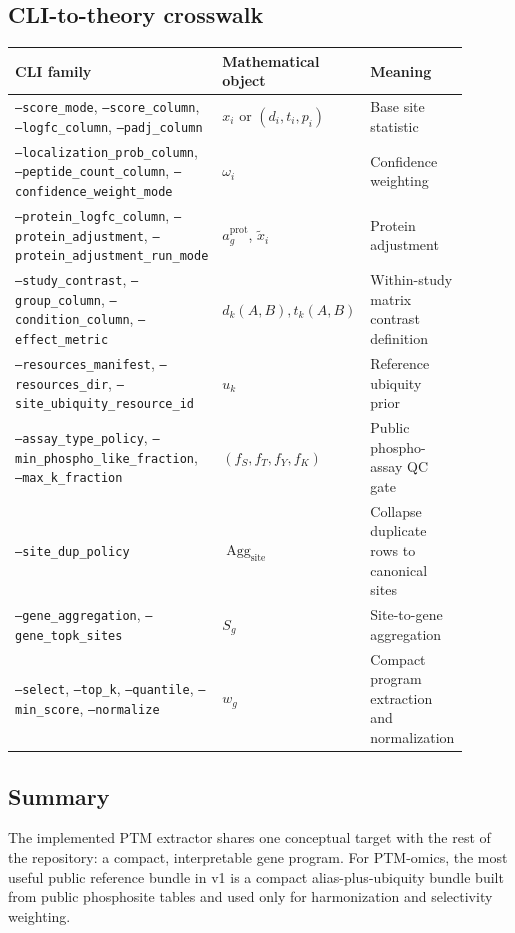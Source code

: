 \documentclass[11pt]{article}
\begin{document}
\subsection{CLI-to-theory crosswalk}
\begin{center}
\begin{tabular}{p{0.30\linewidth} p{0.28\linewidth} p{0.32\linewidth}}
\hline
CLI family & Mathematical object & Meaning \\
\hline
\texttt{--score\_mode}, \texttt{--score\_column}, \texttt{--logfc\_column},
\texttt{--padj\_column} & $x_i$ or $(d_i,t_i,p_i)$ &
Base site statistic \\
\texttt{--localization\_prob\_column}, \texttt{--peptide\_count\_column},
\texttt{--confidence\_weight\_mode} & $\omega_i$ &
Confidence weighting \\
\texttt{--protein\_logfc\_column}, \texttt{--protein\_adjustment},
\texttt{--protein\_adjustment\_run\_mode} &
$a_g^{\mathrm{prot}}$, $\widetilde{x}_i$ &
Protein adjustment \\
\texttt{--study\_contrast}, \texttt{--group\_column},
\texttt{--condition\_column}, \texttt{--effect\_metric} &
$d_k(A,B), t_k(A,B)$ &
Within-study matrix contrast definition \\
\texttt{--resources\_manifest}, \texttt{--resources\_dir},
\texttt{--site\_ubiquity\_resource\_id} & $u_k$ &
Reference ubiquity prior \\
\texttt{--assay\_type\_policy}, \texttt{--min\_phospho\_like\_fraction},
\texttt{--max\_k\_fraction} & $(f_S,f_T,f_Y,f_K)$ &
Public phospho-assay QC gate \\
\texttt{--site\_dup\_policy} & $\operatorname{Agg}_{\mathrm{site}}$ &
Collapse duplicate rows to canonical sites \\
\texttt{--gene\_aggregation}, \texttt{--gene\_topk\_sites} &
$S_g$ &
Site-to-gene aggregation \\
\texttt{--select}, \texttt{--top\_k}, \texttt{--quantile},
\texttt{--min\_score}, \texttt{--normalize} & $w_g$ &
Compact program extraction and normalization \\
\hline
\end{tabular}
\end{center}

\subsection{Summary}
The implemented PTM extractor shares one conceptual target with the rest of the
repository: a compact, interpretable gene program. For PTM-omics, the most
useful public reference bundle in v1 is a compact alias-plus-ubiquity bundle
built from public phosphosite tables and used only for harmonization and
selectivity weighting.
\end{document}
